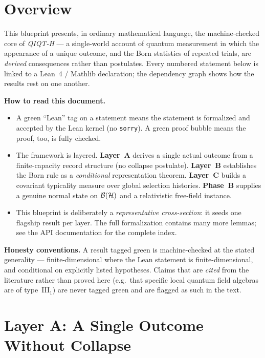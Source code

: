 
\chapter{Overview}

This blueprint presents, in ordinary mathematical language, the machine-checked
core of \emph{QIQT-H} --- a single-world account of quantum measurement in which
the appearance of a unique outcome, and the Born statistics of repeated trials,
are \emph{derived} consequences rather than postulates. Every numbered statement
below is linked to a Lean~4 / Mathlib declaration; the dependency graph shows how
the results rest on one another.

\medskip
\noindent\textbf{How to read this document.}
\begin{itemize}
  \item A green ``Lean'' tag on a statement means the statement is formalized and
        accepted by the Lean kernel (no \texttt{sorry}). A green proof bubble means
        the proof, too, is fully checked.
  \item The framework is layered. \textbf{Layer~A} derives a single actual outcome
        from a finite-capacity record structure (no collapse postulate).
        \textbf{Layer~B} establishes the Born rule as a \emph{conditional}
        representation theorem. \textbf{Layer~C} builds a covariant typicality
        measure over global selection histories. \textbf{Phase~B} supplies a genuine
        normal state on $\mathcal{B}(\mathcal{H})$ and a relativistic free-field instance.
  \item This blueprint is deliberately a \emph{representative cross-section}: it
        seeds one flagship result per layer. The full formalization contains many
        more lemmas; see the API documentation for the complete index.
\end{itemize}

\medskip
\noindent\textbf{Honesty conventions.} A result tagged green is machine-checked at
the stated generality --- finite-dimensional where the Lean statement is
finite-dimensional, and conditional on explicitly listed hypotheses. Claims that
are \emph{cited} from the literature rather than proved here (e.g.\ that specific
local quantum field algebras are of type~III$_1$) are never tagged green and are
flagged as such in the text.


\chapter{Layer A: A Single Outcome Without Collapse}
\label{chap:layerA}

